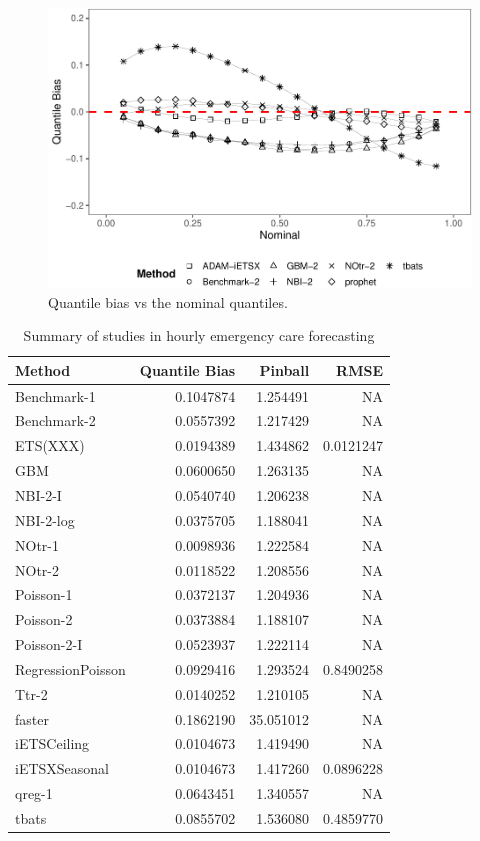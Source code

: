 \documentclass[]{elsarticle} %
\begin{document}
\begin{figure}[H]

{\centering \includegraphics[width=0.9\linewidth]{paper_files/figure-latex/quantile-bias-1} 

}

\caption{Quantile bias vs the nominal quantiles.}\label{fig:quantile-bias}
\end{figure}

\begin{table}[!h]

\caption{\label{tab:tab-results}Summary of studies in hourly emergency care forecasting}
\centering
\fontsize{11}{13}\selectfont
\begin{tabular}[t]{lrrr}
\toprule
Method & Quantile Bias & Pinball & RMSE\\
\midrule
Benchmark-1 & 0.1047874 & 1.254491 & NA\\
Benchmark-2 & 0.0557392 & 1.217429 & NA\\
ETS(XXX) & 0.0194389 & 1.434862 & 0.0121247\\
GBM & 0.0600650 & 1.263135 & NA\\
NBI-2-I & 0.0540740 & 1.206238 & NA\\
NBI-2-log & 0.0375705 & 1.188041 & NA\\
NOtr-1 & 0.0098936 & 1.222584 & NA\\
NOtr-2 & 0.0118522 & 1.208556 & NA\\
Poisson-1 & 0.0372137 & 1.204936 & NA\\
Poisson-2 & 0.0373884 & 1.188107 & NA\\
Poisson-2-I & 0.0523937 & 1.222114 & NA\\
RegressionPoisson & 0.0929416 & 1.293524 & 0.8490258\\
Ttr-2 & 0.0140252 & 1.210105 & NA\\
faster & 0.1862190 & 35.051012 & NA\\
iETSCeiling & 0.0104673 & 1.419490 & NA\\
iETSXSeasonal & 0.0104673 & 1.417260 & 0.0896228\\
qreg-1 & 0.0643451 & 1.340557 & NA\\
tbats & 0.0855702 & 1.536080 & 0.4859770\\
\bottomrule
\end{tabular}
\end{table}
\end{document}
